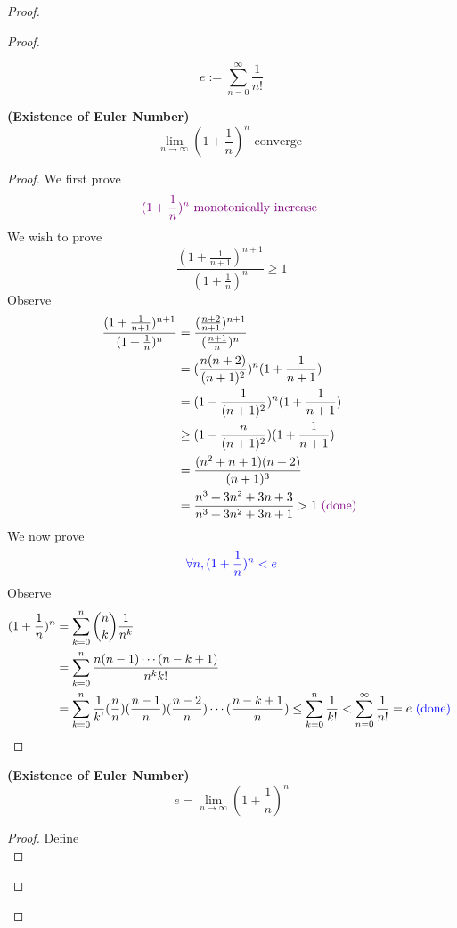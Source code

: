 \documentclass{report}
\begin{document}
\begin{proof}
\begin{proof}
\begin{definition}
\begin{equation}
e:=\sum_{n=0}^\infty \frac{1}{n!}
\end{equation}
\end{definition}
\begin{theorem}
\label{4.4.4}
\textbf{(Existence of Euler Number)}
\begin{equation}
\lim_{n\to\infty} (1+\frac{1}{n})^n\text{ converge }
\end{equation}
\end{theorem}
\begin{proof}
We first prove
\begin{equation}
\textcolor{violet}{(1+\frac{1}{n})^n\text{ monotonically increase }}
\end{equation}
We wish to prove
\begin{equation}
\frac{(1+\frac{1}{n+1})^{n+1}}{(1+\frac{1}{n})^n}\geq 1
\end{equation}
Observe
\begin{align}
\frac{(1+\frac{1}{n+1})^{n+1}}{(1+\frac{1}{n})^n}&=\frac{(\frac{n+2}{n+1})^{n+1}}{(\frac{n+1}{n})^n}\\
&=(\frac{n(n+2)}{(n+1)^2})^n(1+\frac{1}{n+1})\\
&=(1-\frac{1}{(n+1)^2})^n (1+\frac{1}{n+1})\\
&\geq (1-\frac{n}{(n+1)^2})(1+\frac{1}{n+1})\\
&=\frac{(n^2+n+1)(n+2)}{(n+1)^3}\\
&=\frac{n^3+3n^2+3n+3}{n^3+3n^2+3n+1}> 1\textcolor{violet}{\text{ (done) }}
\end{align}
We now prove
\begin{equation}
  \textcolor{blue}{\forall n,(1+\frac{1}{n})^n<e}
\end{equation}
Observe
\begin{align}
  (1+\frac{1}{n})^n&= \sum_{k=0}^n \binom{n}{k}\frac{1}{n^k}\\
  &=\sum_{k=0}^n \frac{n(n-1)\cdots (n-k+1)}{n^kk!}\\
  &=\sum_{k=0}^n \frac{1}{k!}(\frac{n}{n})(\frac{n-1}{n})(\frac{n-2}{n})\cdots (\frac{n-k+1}{n})\leq \sum_{k=0}^n \frac{1}{k!}<\sum_{n=0}^\infty \frac{1}{n!}=e\textcolor{blue}{\text{ (done) }}
\end{align}
\end{proof}
\begin{theorem}
\label{4.4.5}
\textbf{(Existence of Euler Number)} 
\begin{equation}
e=\lim_{n\to\infty}(1+\frac{1}{n})^n
\end{equation}
\end{theorem}
\begin{proof}
Define
\begin{equation}

\end{equation}
\end{proof}
\end{proof}
\end{proof}
\end{document}
